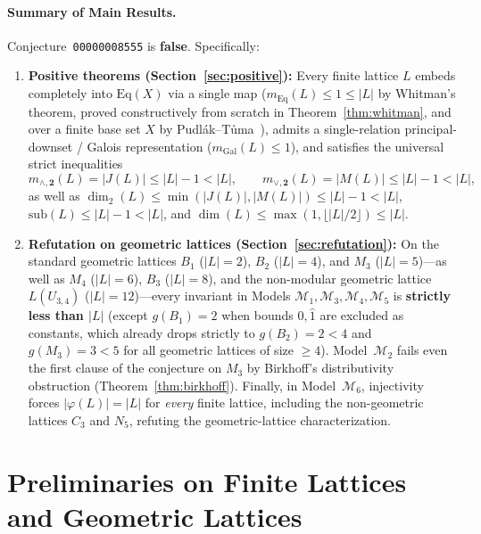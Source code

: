 \documentclass[11pt]{article}
\theoremstyle{definition}
\theoremstyle{remark}
\newcommand{\Eq}{\mathrm{Eq}}
\newcommand{\BoolTwo}{\mathbf{2}}
\begin{document}
\paragraph{Summary of Main Results.}
Conjecture~\texttt{00000008555} is \textbf{false}. Specifically:
\begin{enumerate}
\item \textbf{Positive theorems (Section~\ref{sec:positive}):} Every finite lattice $L$ embeds completely into $\Eq(X)$ via a single map ($m_{\Eq}(L) \le 1 \le |L|$ by Whitman's theorem, proved constructively from scratch in Theorem~\ref{thm:whitman}, and over a finite base set $X$ by Pudl\'ak--T\r{u}ma~\cite{PudlakTuma1980}), admits a single-relation principal-downset / Galois representation ($m_{\mathrm{Gal}}(L) \le 1$), and satisfies the universal strict inequalities
\[
  m_{\wedge,\BoolTwo}(L) = |J(L)| \le |L| - 1 < |L|, \qquad
  m_{\vee,\BoolTwo}(L) = |M(L)| \le |L| - 1 < |L|,
\]
as well as $\dim_2(L) \le \min(|J(L)|,|M(L)|) \le |L|-1 < |L|$, $\mathrm{sub}(L) \le |L|-1 < |L|$, and $\dim(L) \le \max(1,\lfloor |L|/2 \rfloor) \le |L|$.
\item \textbf{Refutation on geometric lattices (Section~\ref{sec:refutation}):} On the standard geometric lattices $B_1$ ($|L|=2$), $B_2$ ($|L|=4$), and $M_3$ ($|L|=5$)---as well as $M_4$ ($|L|=6$), $B_3$ ($|L|=8$), and the non-modular geometric lattice $L(U_{3,4})$ ($|L|=12$)---every invariant in Models $\mathcal{M}_1, \mathcal{M}_3, \mathcal{M}_4, \mathcal{M}_5$ is \textbf{strictly less than $|L|$} (except $g(B_1)=2$ when bounds $\hat{0},\hat{1}$ are excluded as constants, which already drops strictly to $g(B_2)=2<4$ and $g(M_3)=3<5$ for all geometric lattices of size $\ge 4$). Model~$\mathcal{M}_2$ fails even the first clause of the conjecture on $M_3$ by Birkhoff's distributivity obstruction (Theorem~\ref{thm:birkhoff}). Finally, in Model~$\mathcal{M}_6$, injectivity forces $|\varphi(L)| = |L|$ for \emph{every} finite lattice, including the non-geometric lattices $C_3$ and $N_5$, refuting the geometric-lattice characterization.
\end{enumerate}

\section{Preliminaries on Finite Lattices and Geometric Lattices}
\label{sec:prelim}
\end{document}
